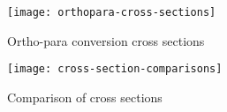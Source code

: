 \documentclass[Dissertation.tex]{subfiles}
\begin{document}


\begin{figure}[H]
	\centering
	\texttt{[image: orthopara-cross-sections]}
	\caption{Ortho-para conversion cross sections}
	\label{fig:orthopara-cross-sections}
\end{figure}

\begin{figure}[H]
	\centering
	\texttt{[image: cross-section-comparisons]}
	\caption{Comparison of cross sections}
	\label{fig:cross-section-comparisons}
\end{figure}





\biblio
\end{document}
